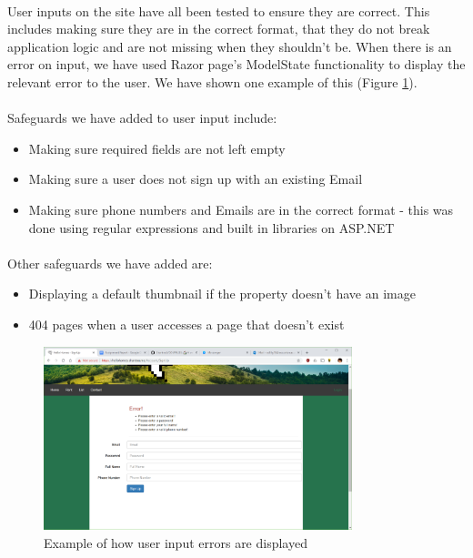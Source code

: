 \documentclass{article}
\begin{document}
        \paragraph{}
            User inputs on the site have all been tested to ensure they are correct. This includes making sure they are in the correct format, that they do not break application logic and are not missing when they shouldn't be.
            When there is an error on input, we have used Razor page’s ModelState functionality to display the relevant error to the user. We have shown one example of this (Figure \ref{fig:logic_error}).

        \paragraph{}
            Safeguards we have added to user input include:
            \begin{itemize}\itemsep 0pt
                \item Making sure required fields are not left empty
                \item Making sure a user does not sign up with an existing Email
                \item Making sure phone numbers and Emails are in the correct format - this was done using regular expressions and built in libraries on ASP.NET
            \end{itemize}

        \paragraph{}
            Other safeguards we have added are:
            \begin{itemize}\itemsep 0pt
                \item Displaying a default thumbnail if the property doesn't have an image
                \item 404 pages when a user accesses a page that doesn't exist
            \end{itemize}

            \begin{figure}[!htb]
                \centering
                \includegraphics[width=0.8\textwidth]{figures/logic_error.png}
                \caption[Logic Error]{Example of how user input errors are displayed}
                \label{fig:logic_error}
            \end{figure}
\end{document}

